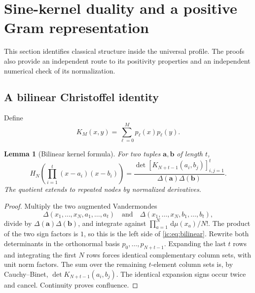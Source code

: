 \documentclass[11pt,a4paper]{article}
\numberwithin{equation}{section}
\newtheorem{lemma}[theorem]{Lemma}
\theoremstyle{definition}
\theoremstyle{remark}
\newcommand{\dd}{\mathrm d}
\newcommand{\Del}{\Delta}
\begin{document}
\section{Sine-kernel duality and a positive Gram representation}
\label{ic:sec:kernel}
This section identifies classical structure inside the universal
profile. The proofs also provide an independent route to its positivity
properties and an independent numerical check of its normalization.

\subsection{A bilinear Christoffel identity}
Define
\begin{equation}\label{ic:eq:kernel}
 K_M(x,y)=\sum_{\ell=0}^M p_\ell(x)p_\ell(y).
\end{equation}

\begin{lemma}[Bilinear kernel formula]\label{ic:lem:bilinear}
For two tuples $\boldsymbol a,\boldsymbol b$ of length $t$,
\begin{equation}\label{ic:eq:bilinear}
 H_N\left(\prod_{i=1}^t(x-a_i)(x-b_i)\right)=
 \frac{\det[K_{N+t-1}(a_i,b_j)]_{i,j=1}^t}
 {\Del(\boldsymbol a)\Del(\boldsymbol b)}.
\end{equation}
The quotient extends to repeated nodes by normalized derivatives.
\end{lemma}
\begin{proof}
Multiply the two augmented Vandermondes
\[
 \Del(x_1,\ldots,x_N,a_1,\ldots,a_t)
 \quad\text{and}\quad
 \Del(x_1,\ldots,x_N,b_1,\ldots,b_t),
\]
divide by $\Del(\boldsymbol a)\Del(\boldsymbol b)$, and integrate
against $\prod_{a=1}^N\,\dd\mu(x_a)/N!$.
The product of the two sign factors is $1$, so this is the left side of
\eqref{ic:eq:bilinear}. Rewrite both determinants in the orthonormal basis
$p_0,\ldots,p_{N+t-1}$. Expanding the last $t$ rows and integrating the
first $N$ rows forces identical complementary column sets, with unit
norm factors. The sum over the remaining $t$-element column sets is,
by Cauchy--Binet, $\det K_{N+t-1}(a_i,b_j)$. The identical expansion signs
occur twice and cancel. Continuity proves confluence.
\end{proof}
\end{document}
